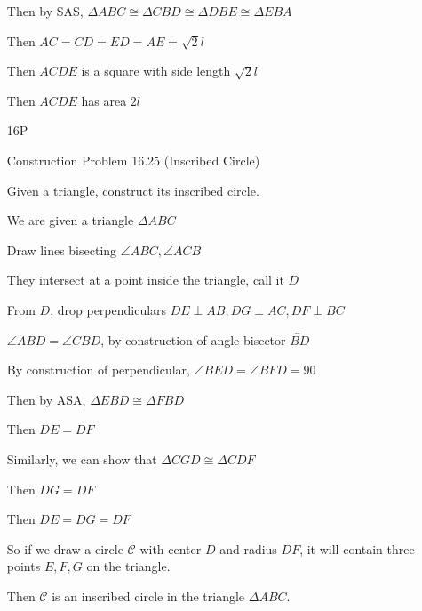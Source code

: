 \documentclass[11pt]{article}
\newcommand{\lines}[1]{\overleftrightarrow{#1}}
\begin{document}
\begin{itemize}
		Then by SAS, $\Delta ABC \cong \Delta CBD \cong \Delta DBE \cong \Delta EBA$

		Then $AC = CD = ED = AE = \sqrt{2}l$

		Then $ACDE$ is a square with side length $\sqrt{2}l$

		Then $ACDE$ has area $2l$

	\item[16P]

		Construction Problem 16.25 (Inscribed Circle)

		Given a triangle, construct its inscribed circle.

		We are given a triangle $\Delta ABC$

		Draw lines bisecting $\angle ABC, \angle ACB$

		They intersect at a point inside the triangle, call it $D$

		From $D$, drop perpendiculars $DE \perp AB, DG \perp AC, DF \perp BC$

		$\angle ABD = \angle CBD$, by construction of angle bisector $\lines{BD}$

		By construction of perpendicular, $\angle BED = \angle BFD = 90$

		Then by ASA, $\Delta EBD \cong \Delta FBD$

		Then $DE = DF$

		Similarly, we can show that $\Delta CGD \cong \Delta CDF$

		Then $DG = DF$

		Then $DE = DG = DF$

		So if we draw a circle $\mathscr{C}$ with center $D$ and radius $DF$, it will contain three points $E,F,G$ on the triangle.

		Then $\mathscr{C}$ is an inscribed circle in the triangle $\Delta ABC$.

\end{itemize}
\end{document}
